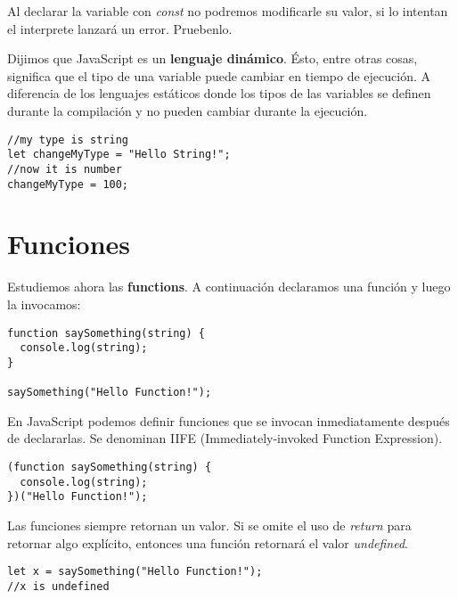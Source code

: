 \documentclass[a4paper, oneside, titlepage, 12pt]{book}
\begin{document}
Al declarar la variable con \textit{const} no podremos modificarle su valor, si lo intentan el interprete lanzará un error. Pruebenlo.  
\newline

Dijimos que JavaScript es un \textbf{lenguaje dinámico}. Ésto, entre otras cosas, significa que el tipo de una variable puede cambiar en tiempo de ejecución. A diferencia de los lenguajes estáticos donde los tipos de las variables se definen durante la compilación y no pueden cambiar durante la ejecución.

\begin{verbatim}
//my type is string
let changeMyType = "Hello String!";
//now it is number
changeMyType = 100;
\end{verbatim}

\section{Funciones} \label{functions}

Estudiemos ahora las \textbf{functions}. A continuación declaramos una función y luego la invocamos:

\begin{verbatim}
function saySomething(string) {
  console.log(string);
}

saySomething("Hello Function!");
\end{verbatim}

En JavaScript podemos definir funciones que se invocan inmediatamente después de declararlas. Se denominan IIFE (Immediately-invoked Function Expression).

\begin{verbatim}
(function saySomething(string) {
  console.log(string);
})("Hello Function!");
\end{verbatim}

Las funciones siempre retornan un valor. Si se omite el uso de \textit{return} para retornar algo explícito, entonces una función retornará el valor \textit{undefined}.

\begin{verbatim}
let x = saySomething("Hello Function!");
//x is undefined
\end{verbatim}
\end{document}
